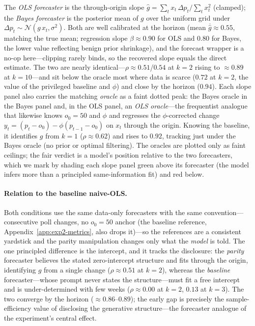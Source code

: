 \documentclass{article} %
\begin{document}
The \emph{OLS forecaster} is the through-origin slope $\hat g=\sum_t x_t\,\Delta p_t/\sum_t x_t^2$
(clamped); the \emph{Bayes forecaster} is the posterior mean of $g$ over the uniform grid under
$\Delta p_t\sim\mathcal N(g\,x_t,\sigma^2)$.  Both are well calibrated at the horizon (mean
$\overline{\hat g}\approx0.55$, matching the true mean; regression slope $\beta\approx0.90$ for OLS
and $0.80$ for Bayes, the lower value reflecting benign prior shrinkage), and the forecast wrapper is
a no-op here---clipping rarely binds, so the recovered slope equals the direct estimate.  The two are
nearly identical---$\rho\approx0.51$/$0.54$ at $k{=}2$ rising to $\approx0.89$ at $k{=}10$---and sit
below the oracle most where data is scarce ($0.72$ at $k{=}2$, the value of the privileged baseline
and $\phi$) and close by the horizon ($0.94$).  Each slope panel also carries the matching
\emph{oracle} as a faint dotted peak: the Bayes oracle in the Bayes panel and, in the OLS panel, an
\emph{OLS oracle}---the frequentist analogue that likewise knows $o_0{=}50$ and $\phi$ and regresses
the $\phi$-corrected change $y_t=(p_t-o_0)-\phi(p_{t-1}-o_0)$ on $x_t$ through the origin.  Knowing
the baseline, it identifies $g$ from $k{=}1$ ($\rho\approx0.62$) and rises to $0.92$, tracking just
under the Bayes oracle (no prior or optimal filtering).  The oracles are plotted only as faint
ceilings; the fair verdict is a model's position relative to the two forecasters, which we mark by
shading each slope panel green above its forecaster (the model infers more than a principled
same-information fit) and red below.

\paragraph{Relation to the baseline naive-OLS.}  Both conditions use the same data-only forecasters
with the same convention---consecutive poll changes, no $o_0{=}50$ anchor (the baseline reference,
Appendix~\ref{app:exp2-metrics}, also drops it)---so the references are a consistent yardstick and
the parity manipulation changes only what the \emph{model} is told.  The one principled difference is
the intercept, and it tracks the disclosure: the \emph{parity} forecaster believes the stated
zero-intercept structure and fits through the origin, identifying $g$ from a single change
($\rho\approx0.51$ at $k{=}2$), whereas the \emph{baseline} forecaster---whose prompt never states
the structure---must fit a free intercept and is under-determined with few weeks
($\rho\approx0.00$ at $k{=}2$, $0.13$ at $k{=}3$).  The two converge by the horizon
($\approx0.86$--$0.89$); the early gap is precisely the sample-efficiency value of disclosing the
generative structure---the forecaster analogue of the experiment's central effect.
\end{document}
